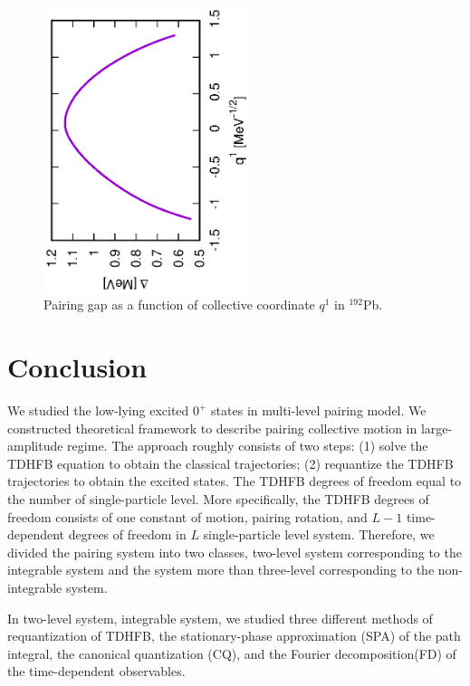 \documentclass[11pt]{book} %
\begin{document}
\begin{figure}[t]
 \begin{center}
  \includegraphics[width=60mm,angle=-90]{images/192Pbgap.eps}
 \end{center}
	\caption{Pairing gap as a function of collective coordinate $q^1$
	in ${}^{192}$Pb. 
}
 \label{192Pb_gap}
\end{figure}

\clearpage{\pagestyle{empty}\cleardoublepage}
\chapter{Conclusion}
\label{conclusion}

We studied the low-lying excited $0^+$ states in multi-level pairing model. We constructed theoretical framework to describe pairing collective motion in large-amplitude regime. The approach roughly consists of two steps: (1) solve the TDHFB equation to obtain the classical trajectories; (2) requantize the TDHFB trajectories to obtain the excited states. The TDHFB degrees of freedom equal to the number of single-particle level. More specifically, the TDHFB degrees of freedom consists of one constant of motion, pairing rotation, and $L-1$ time-dependent degrees of freedom in $L$ single-particle level system. Therefore, we divided the pairing system into two classes, two-level system corresponding to the integrable system and the system more than three-level corresponding to the non-integrable system. 

In two-level system, integrable system, we studied three different methods of requantization of TDHFB, the stationary-phase approximation (SPA) of the path integral, the canonical quantization (CQ), and the Fourier decomposition(FD) of the time-dependent observables. 
\end{document}
